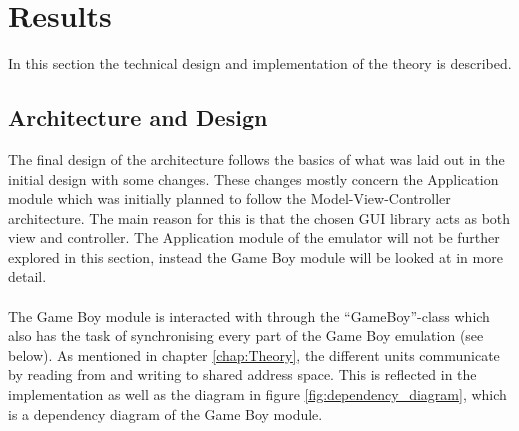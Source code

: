 \chapter{Results}


In this section the technical design and implementation of the theory is described.

\section{Architecture and Design}
\label{sec:resultsarchitecture}
The final design of the architecture follows the basics of what was laid out in the initial design with some changes. These changes mostly concern the Application module which was initially planned to follow the Model-View-Controller architecture. The main reason for this is that the chosen GUI library acts as both view and controller. The Application module of the emulator will not be further explored in this section, instead the Game Boy module will be looked at in more detail.
\\\\
The Game Boy module is interacted with through the ``GameBoy''-class which also has the task of synchronising every part of the Game Boy emulation (see below). As mentioned in chapter \ref{chap:Theory}, the different units communicate by reading from and writing to shared address space. This is reflected in the implementation as well as the diagram in figure \ref{fig:dependency_diagram}, which is a dependency diagram of the Game Boy module.

